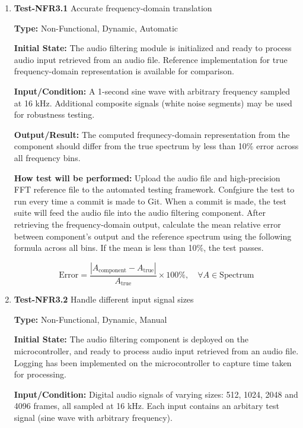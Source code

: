 \documentclass[12pt, titlepage]{article}
\begin{document}
\begin{enumerate}

\item{\textbf{Test-NFR3.1} Accurate frequency-domain translation\\}

\textbf{Type:} Non-Functional, Dynamic, Automatic
					
\textbf{Initial State:} 
The audio filtering module is initialized and ready to process audio input 
retrieved from an audio file. Reference implementation for true 
frequency-domain representation is available for comparison. 
					
\textbf{Input/Condition:} 
A 1-second sine wave with arbitrary frequency sampled at 16 kHz. Additional 
composite signals (white noise segments) may be used for robustness testing. 
					
\textbf{Output/Result:} 
The computed frequnecy-domain representation from the component should differ 
from the true spectrum by less than 10\% error across all frequency bins. 
					
\textbf{How test will be performed:} 
Upload the audio file and high-precision FFT reference file to the automated 
testing framework. Confgiure the test to run every time a commit is made to 
Git. When a commit is made, the test suite will feed the audio file into the 
audio filtering component. After retrieving the frequency-domain output, 
calculate the mean relative error between component's output and the reference 
spectrum using the following formula across all bins. If the mean is less than 
10\%, the test passes. 

\[
\text{Error} = \frac{\left|A_{\text{component}} - A_{\text{true}}\right|}{A_{\text{true}}} \times 100\%, 
\quad \forall A \in \text{Spectrum}
\]
					
\item{\textbf{Test-NFR3.2} Handle different input signal sizes\\}

\textbf{Type:} Non-Functional, Dynamic, Manual
					
\textbf{Initial State:} 
The audio filtering component is deployed on the microcontroller, and ready to 
process audio input retrieved from an audio file. Logging has been 
implemented on the microcontroller to capture time taken for processing.
					
\textbf{Input/Condition:} 
Digital audio signals of varying sizes: 512, 1024, 2048 and 4096 frames, all 
sampled at 16 kHz. Each input contains an arbitary test signal (sine wave with 
arbitrary frequency). 
					

\end{enumerate}
\end{document}
